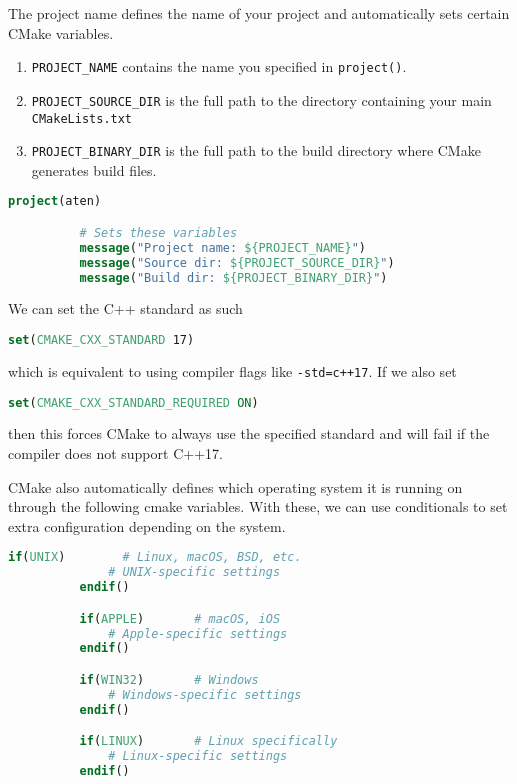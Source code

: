\documentclass{article}
\begin{document}
      \begin{definition}
        The project name defines the name of your project and automatically sets certain CMake variables. 
        \begin{enumerate}
          \item \texttt{PROJECT\_NAME} contains the name you specified in \texttt{project()}. 
          \item \texttt{PROJECT\_SOURCE\_DIR} is the full path to the directory containing your main \texttt{CMakeLists.txt} 
          \item \texttt{PROJECT\_BINARY\_DIR} is the full path to the build directory where CMake generates build files. 
        \end{enumerate}
        \begin{lstlisting}[language=CMake]
          project(aten)

          # Sets these variables
          message("Project name: ${PROJECT_NAME}")
          message("Source dir: ${PROJECT_SOURCE_DIR}")
          message("Build dir: ${PROJECT_BINARY_DIR}") 
        \end{lstlisting}
      \end{definition}

      \begin{definition}[C++ Standards]
        We can set the C++ standard as such
        \begin{lstlisting}[language=CMake]
          set(CMAKE_CXX_STANDARD 17)
        \end{lstlisting}
        which is equivalent to using compiler flags like \texttt{-std=c++17}. If we also set 
        \begin{lstlisting}[language=CMake]
          set(CMAKE_CXX_STANDARD_REQUIRED ON)
        \end{lstlisting}
        then this forces CMake to always use the specified standard and will fail if the compiler does not support C++17. 
      \end{definition}

      \begin{definition}
        CMake also automatically defines which operating system it is running on through the following cmake variables. With these, we can use conditionals to set extra configuration depending on the system. 
        \begin{lstlisting}[language=CMake]
          if(UNIX)        # Linux, macOS, BSD, etc.
              # UNIX-specific settings
          endif()

          if(APPLE)       # macOS, iOS
              # Apple-specific settings
          endif()

          if(WIN32)       # Windows
              # Windows-specific settings
          endif()

          if(LINUX)       # Linux specifically
              # Linux-specific settings
          endif() 
        \end{lstlisting}
      \end{definition}
\end{document}
